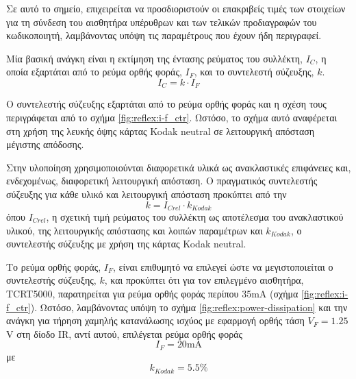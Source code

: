 Σε αυτό το σημείο, επιχειρείται να προσδιοριστούν οι επακριβείς τιμές των
στοιχείων για τη σύνδεση του αισθητήρα υπέρυθρων και των τελικών προδιαγραφών
του κωδικοποιητή, λαμβάνοντας υπόψη τις παραμέτρους που έχουν ήδη περιγραφεί.

Μία βασική ανάγκη είναι η εκτίμηση της έντασης ρεύματος του συλλέκτη, ${I_C}$, η
οποία εξαρτάται από το ρεύμα ορθής φοράς, $I_F$, και το συντελεστή σύζευξης,
$k$.
\begin{equation}
I_C = k \cdot I_F \label{eq:reflex:i-c}
\end{equation}

Ο συντελεστής σύζευξης εξαρτάται από το ρεύμα ορθής φοράς και η σχέση τους
περιγράφεται από το σχήμα \ref{fig:reflex:i-f_ctr}. Ωστόσο, το σχήμα αυτό
αναφέρεται στη χρήση της
λευκής όψης κάρτας Kodak neutral σε λειτουργική απόσταση μέγιστης απόδοσης.

Στην υλοποίηση χρησιμοποιούνται διαφορετικά υλικά ως ανακλαστικές επιφάνειες
και, ενδεχομένως, διαφορετική λειτουργική απόσταση. Ο πραγματικός συντελεστής
σύζευξης για κάθε υλικό και λειτουργική απόσταση προκύπτει από την
\begin{equation}
k = I_{Crel} \cdot k_{Kodak} \label{eq:reflex:k}
\end{equation}
όπου $I_{Crel}$, η σχετική τιμή ρεύματος του συλλέκτη ως αποτέλεσμα του
ανακλαστικού υλικού, της λειτουργικής απόστασης και λοιπών παραμέτρων και
$k_{Kodak}$, ο συντελεστής σύζευξης με χρήση της κάρτας Kodak neutral.


Το ρεύμα ορθής φοράς, $I_F$, είναι επιθυμητό να επιλεγεί ώστε να μεγιστοποιείται
ο συντελεστής σύζευξης, $k$, και προκύπτει ότι για τον επιλεγμένο αισθητήρα,
TCRT5000, παρατηρείται για ρεύμα ορθής φοράς περίπου 35mA (σχήμα
\ref{fig:reflex:i-f_ctr}).
Ωστόσο, λαμβάνοντας υπόψη το σχήμα \ref{fig:reflex:power-dissipation} και την
ανάγκη για τήρηση χαμηλής κατανάλωσης ισχύος με εφαρμογή ορθής τάση
$V_F = 1.25$V στη δίοδο IR, αντί αυτού, επιλέγεται ρεύμα ορθής φοράς
\begin{equation}
I_F = 20\text{mA} \label{eq:reflex:i-f_value}
\end{equation}
με
\begin{equation}
k_{Kodak} = 5.5\% \label{eq:reflex:k_kodak-value}
\end{equation}


